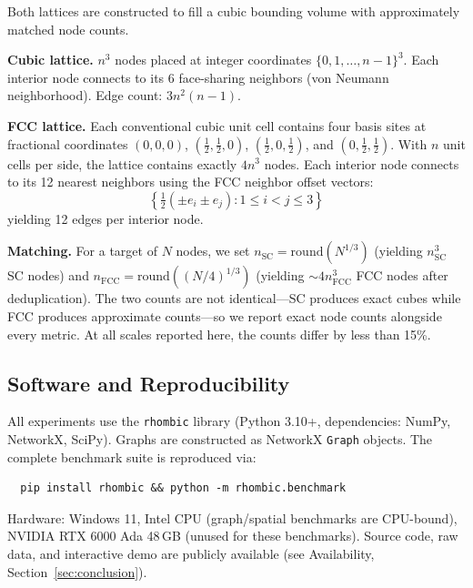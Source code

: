 \documentclass[11pt]{article}
\begin{document}
Both lattices are constructed to fill a cubic bounding volume
with approximately matched node counts.

\textbf{Cubic lattice.} $n^3$ nodes placed at integer coordinates
$\{0, 1, \ldots, n{-}1\}^3$. Each interior node connects to its
6 face-sharing neighbors (von Neumann neighborhood). Edge count:
$3n^2(n-1)$.

\textbf{FCC lattice.} Each conventional cubic unit cell contains four
basis sites at fractional coordinates $(0,0,0)$, $(\tfrac{1}{2},\tfrac{1}{2},0)$,
$(\tfrac{1}{2},0,\tfrac{1}{2})$, and $(0,\tfrac{1}{2},\tfrac{1}{2})$.
With $n$ unit cells per side, the lattice contains exactly $4n^3$ nodes.
Each interior node connects
to its 12 nearest neighbors using the FCC neighbor offset vectors:
\begin{equation}
  \left\{\tfrac{1}{2}(\pm e_i \pm e_j) : 1 \leq i < j \leq 3\right\}
\end{equation}
yielding 12 edges per interior node.

\textbf{Matching.} For a target of $N$ nodes, we set
$n_{\mathrm{SC}} = \mathrm{round}(N^{1/3})$ (yielding
$n_{\mathrm{SC}}^3$ SC nodes) and
$n_{\mathrm{FCC}} = \mathrm{round}((N/4)^{1/3})$ (yielding
${\sim}4 n_{\mathrm{FCC}}^3$ FCC nodes after deduplication).
The two counts are not identical---SC produces exact cubes while
FCC produces approximate counts---so we report exact node counts
alongside every metric. At all scales reported here, the counts
differ by less than 15\%.

\subsection{Software and Reproducibility}

All experiments use the \texttt{rhombic} library (Python 3.10+,
dependencies: NumPy, NetworkX, SciPy). Graphs are constructed as
NetworkX \texttt{Graph} objects. The complete benchmark suite is
reproduced via:
\begin{verbatim}
  pip install rhombic && python -m rhombic.benchmark
\end{verbatim}
Hardware: Windows 11, Intel CPU (graph/spatial benchmarks are
CPU-bound), NVIDIA RTX 6000 Ada 48\,GB (unused for these
benchmarks). Source code, raw data, and interactive demo are
publicly available (see Availability, Section~\ref{sec:conclusion}).
\end{document}
